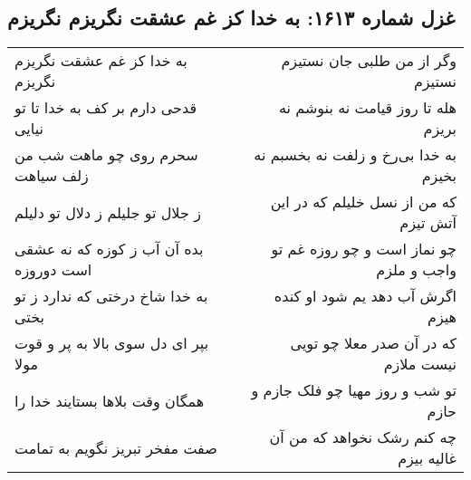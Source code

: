\begin{center}
\section*{غزل شماره ۱۶۱۳: به خدا کز غم عشقت نگریزم نگریزم}
\label{sec:1613}
\begin{longtable}{l p{0.5cm} r}
به خدا کز غم عشقت نگریزم نگریزم
&&
وگر از من طلبی جان نستیزم نستیزم
\\
قدحی دارم بر کف به خدا تا تو نیایی
&&
هله تا روز قیامت نه بنوشم نه بریزم
\\
سحرم روی چو ماهت شب من زلف سیاهت
&&
به خدا بی‌رخ و زلفت نه بخسبم نه بخیزم
\\
ز جلال تو جلیلم ز دلال تو دلیلم
&&
که من از نسل خلیلم که در این آتش تیزم
\\
بده آن آب ز کوزه که نه عشقی است دوروزه
&&
چو نماز است و چو روزه غم تو واجب و ملزم
\\
به خدا شاخ درختی که ندارد ز تو بختی
&&
اگرش آب دهد یم شود او کنده هیزم
\\
بپر ای دل سوی بالا به پر و قوت مولا
&&
که در آن صدر معلا چو تویی نیست ملازم
\\
همگان وقت بلاها بستایند خدا را
&&
تو شب و روز مهیا چو فلک جازم و حازم
\\
صفت مفخر تبریز نگویم به تمامت
&&
چه کنم رشک نخواهد که من آن غالیه بیزم
\\
\end{longtable}
\end{center}
